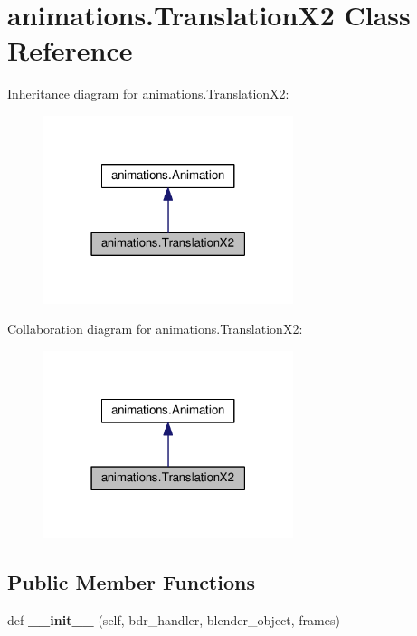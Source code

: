 \hypertarget{classanimations_1_1TranslationX2}{}\section{animations.\+Translation\+X2 Class Reference}
\label{classanimations_1_1TranslationX2}


Inheritance diagram for animations.\+Translation\+X2\+:\nopagebreak
\begin{figure}[H]
\begin{center}
\leavevmode
\includegraphics[width=207pt]{classanimations_1_1TranslationX2__inherit__graph}
\end{center}
\end{figure}


Collaboration diagram for animations.\+Translation\+X2\+:\nopagebreak
\begin{figure}[H]
\begin{center}
\leavevmode
\includegraphics[width=207pt]{classanimations_1_1TranslationX2__coll__graph}
\end{center}
\end{figure}
\subsection*{Public Member Functions}
\begin{DoxyCompactItemize}
\item 
def {\bfseries \+\_\+\+\_\+init\+\_\+\+\_\+} (self, bdr\+\_\+handler, blender\+\_\+object, frames)\hypertarget{classanimations_1_1TranslationX2_a737b82d641d35f73a5072242097aba2e}{}\label{classanimations_1_1TranslationX2_a737b82d641d35f73a5072242097aba2e}

\end{DoxyCompactItemize}
